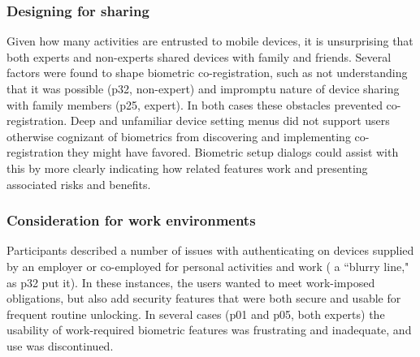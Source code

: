 \subsubsection{Designing for sharing}
Given how many activities are entrusted to mobile devices, it is unsurprising
that both experts and non-experts shared devices with family and friends. %
Several factors were found to shape biometric co-registration, such as not
understanding that it was possible (p32, non-expert) and impromptu nature of
device sharing with family members (p25, expert). In both cases these obstacles
prevented co-registration.  Deep and unfamiliar device setting menus did not support users otherwise cognizant of biometrics from discovering and implementing co-registration they might have favored. Biometric setup dialogs could assist with this by more clearly indicating how related features work and presenting associated risks and benefits. %

\subsubsection{Consideration for work environments}
Participants described a number of issues with authenticating on devices supplied by an employer or co-employed for personal activities and work ( a ``blurry line," as p32 put it).
In these instances, the users wanted to meet work-imposed
obligations, but also add security features that were both secure and usable for frequent routine unlocking. In several cases (p01 and p05, both experts) the usability of work-required biometric features was frustrating and inadequate, and use was discontinued.  %


